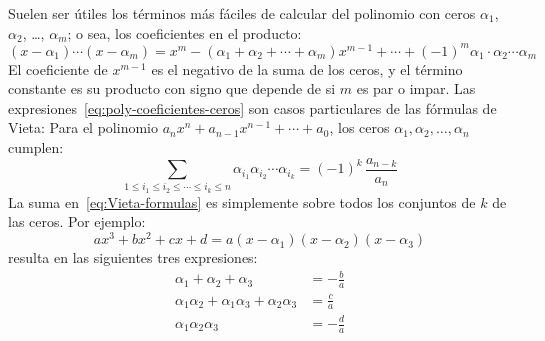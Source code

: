   Suelen ser útiles los términos más fáciles de calcular
  del polinomio
  con ceros \(\alpha_1\), \(\alpha_2\), \ldots, \(\alpha_m\);
  o sea,
  los coeficientes en el producto:%
  \begin{equation}
    \label{eq:poly-coeficientes-ceros}
    (x - \alpha_1) \dotsm (x - \alpha_m)
       = x^m
	 - (\alpha_1 + \alpha_2 + \dotsb + \alpha_m) x^{m - 1}
	 + \dotsb
	 + (-1)^m \alpha_1 \cdot \alpha_2 \dotsm \alpha_m
  \end{equation}
  El coeficiente de \(x^{m - 1}\)
  es el negativo de la suma de los ceros,
  y el término constante es su producto
  con signo que depende de si \(m\) es par o impar.
  Las expresiones~\eqref{eq:poly-coeficientes-ceros}
  son casos particulares de las fórmulas de Vieta:
  Para el polinomio
    \(a_n x^n + a_{n - 1} x^{n - 1} + \dotsb + a_0\),
  los ceros \(\alpha_1, \alpha_2, \dotsc, \alpha_n\) cumplen:
  \begin{equation}
    \label{eq:Vieta-formulas}
    \sum_{1 \le i_1 \le i_2 \le \dotsb \le i_k \le n}
       \alpha_{i_1} \alpha_{i_2} \dotsm \alpha_{i_k}
       = (-1)^k \, \frac{a_{n - k}}{a_n}
  \end{equation}
  La suma en~\eqref{eq:Vieta-formulas} es simplemente
  sobre todos los conjuntos de \(k\) de las ceros.
  Por ejemplo:
  \begin{equation*}
    a x^3 + b x^2 + c x + d
      = a (x - \alpha_1) (x - \alpha_2) (x - \alpha_3)
  \end{equation*}
  resulta en las siguientes tres expresiones:
  \begin{align*}
    \alpha_1 + \alpha_2 + \alpha_3
      &= - \frac{b}{a} \\
    \alpha_1 \alpha_2 + \alpha_1 \alpha_3 + \alpha_2 \alpha_3
      &= \frac{c}{a} \\
    \alpha_1 \alpha_2 \alpha_3
      &= - \frac{d}{a}
  \end{align*}

